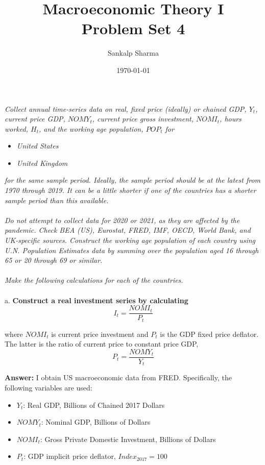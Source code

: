 \documentclass[11pt]{article}
\title{\textbf{Macroeconomic Theory I \\ Problem Set 4}}
\author{Sankalp Sharma}
\date{\today}
\theoremstyle{mytheoremstyle}
\theoremstyle{mytheoremstyle}
\theoremstyle{myproblemstyle}
\begin{document}
    \maketitle

\noindent \textit{Collect annual time-series data on real, fixed price (ideally) or chained GDP, $Y_t$, current price GDP, $NOMY_t$, current price gross investment, $NOMI_t$, hours worked, $H_t$, and the working age population, $POP_t$ for}

\begin{itemize}
    \item \textit{United States}
    \item \textit{United Kingdom }
\end{itemize}

\noindent \textit{for the same sample period. Ideally, the sample period should be at the latest from 1970 through 2019. It can be a little shorter if one of the countries has a shorter sample period than this available.}
\\
\\    
\textit{Do not attempt to collect data for 2020 or 2021, as they are affected by the pandemic. Check BEA (US), Eurostat, FRED, IMF, OECD, World Bank, and UK-specific sources. Construct the working age population of each country using U.N. Population Estimates data by summing over the population aged 16 through 65 or 20 through 69 or similar.}
\\
\\
\textit{Make the following calculations for each of the countries.}
\\
\\
a. \textbf{Construct a real investment series by calculating} $$I_t = \frac{NOMI_t}{P_t}$$

where $NOMI_t$ is current price investment and $P_t$ is the GDP fixed price deflator. The latter is the ratio of current price to constant price GDP, $$ P_t = \frac{NOMY_t}{Y_t}$$

\textbf{Answer:} I obtain US macroeconomic data from FRED. Specifically, the following variables are used:
\begin{itemize}
    \item $Y_t$: Real GDP, Billions of Chained 2017 Dollars
    \item $NOMY_t$: Nominal GDP, Billions of Dollars
    \item $NOMI_t$: Gross Private Domestic Investment, Billions of Dollars
    \item $P_t$: GDP implicit price deflator, $Index_{2017} = 100$
\end{itemize}
\end{document}
